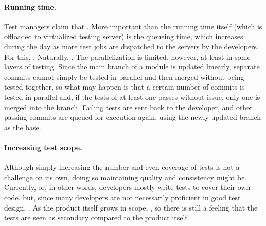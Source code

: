 \paragraph{Running time.} Test managers claim that .
More important than the running time itself (which is offloaded to virtualized testing server) is the queueing time, which increases during the day as more test jobs are dispatched to the servers by the developers. 
For this, .
Naturally, .
The parallelization is limited, however, at least in some layers of testing.
Since the main branch of a module is updated linearly, separate commits cannot simply be tested in parallel and then merged without being tested together, so what may happen is that a certain number of commits is tested in parallel and, if the tests of at least one passes without issue, only one is merged into the branch.
Failing tests are sent back to the developer, and other passing commits are queued for execution again, using the newly-updated branch as the base.

\paragraph{Increasing test scope.} Although simply increasing the number and even coverage of tests is not a challenge on its own, doing so maintaining quality and consistency might be.
Currently,  or, in other words, developers mostly write tests to cover their own code.
 but, since many developers are not necessarily proficient in good test design, .
As the product itself grows in scope, , so there is still a feeling that the tests are seen as secondary compared to the product itself.


